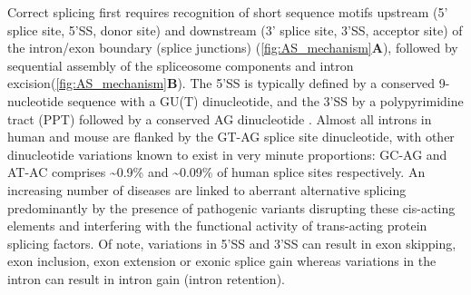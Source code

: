 Correct splicing first requires recognition of short sequence motifs upstream (5' splice site, 5'SS, donor site) and downstream (3' splice site, 3'SS, acceptor site) of the intron/exon boundary (splice junctions) (\cref{fig:AS_mechanism}\textbf{A}),  followed by sequential assembly of the spliceosome components and intron excision\cite{Herzel2017}(\cref{fig:AS_mechanism}\textbf{B}). The 5'SS is typically defined by a conserved 9-nucleotide sequence with a GU(T) dinucleotide, and the 3'SS by a polypyrimidine tract (PPT) followed by a conserved AG dinucleotide \cite{Will2011}. Almost all introns in human and mouse are flanked by the GT-AG splice site dinucleotide\cite{Sheth2006}, with other dinucleotide variations known to exist in very minute proportions: GC-AG and AT-AC comprises \textasciitilde0.9\% and \textasciitilde0.09\% of human splice sites respectively\cite{Parada2014}. An increasing number of diseases are linked to aberrant alternative splicing predominantly by the presence of pathogenic variants disrupting these cis-acting elements and interfering with the functional activity of trans-acting protein splicing factors\cite{Li2017b}. Of note, variations in 5'SS and 3'SS can result in exon skipping, exon inclusion, exon extension or exonic splice gain whereas variations in the intron can result in intron gain (intron retention).

